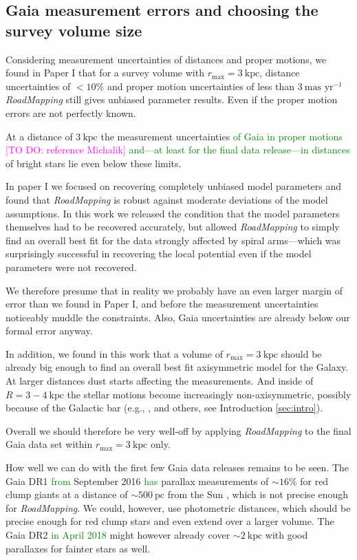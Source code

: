 \documentclass[iop,revtex4,numberedappendix,appendixfloats]{emulateapj}
\newcommand{\RM}{{\sl RoadMapping}}
\newcommand{\Wilma}[1]{\textcolor{Magenta}{#1}}
\newcommand{\NEW}[1]{\textcolor{Green}{#1}}
\newcommand{\OLD}[1]{}
\begin{document}
\subsection{Gaia measurement errors and choosing the survey volume size} \label{sec:discussion_choosing_SV}

Considering measurement uncertainties of distances and proper motions, we found in Paper I that for a survey volume with $r_\text{max} = 3~\text{kpc}$, distance uncertainties of $<10\%$ and proper motion uncertainties of less than $3~\text{mas yr}^{-1}$ \RM{} still gives unbiased parameter results. Even if the proper motion errors are not perfectly known. 

At a distance of $3~\text{kpc}$ the measurement uncertainties \NEW{of Gaia in proper motions \Wilma{[TO DO: reference Michalik]} and---at least for the final data release---in distances} of bright stars \OLD{in (at least the final data release of) Gaia} lie even below these limits. 

In paper I we focused on recovering completely unbiased model parameters and found that \RM{} is robust against moderate deviations of the model assumptions. In this work we released the condition that the model parameters themselves had to be recovered accurately, but allowed \RM{} to simply find an overall best fit for the data strongly affected by spiral arms---which was surprisingly successful in recovering the local potential even if the model parameters were not recovered. 

We therefore presume that in reality we probably have an even larger margin of error than we found in Paper I, and before the measurement uncertainties noticeably muddle the constraints. Also, Gaia uncertainties are already below our formal error anyway.

In addition, we found in this work that a volume of $r_\text{max} = 3~\text{kpc}$ should be already big enough to find an overall best fit axisymmetric model for the Galaxy. At larger distances dust starts affecting the measurements. And inside of $R=3-4~\text{kpc}$ the stellar motions become increasingly non-axisymmetric, possibly because  of the Galactic bar (e.g., \citealt{2014ApJ...783..130R,2015ApJ...800...83B}, and others, see Introduction \ref{sec:intro}).

Overall we should therefore be very well-off by applying \RM{} to the final Gaia data set within $r_\text{max}=3~\text{kpc}$ only.

How well we can do with the first few Gaia data releases remains to be seen. The Gaia DR1 \OLD{in}\NEW{from} September 2016 \OLD{will have}\NEW{has} parallax measurements of $\sim16\%$ for red clump giants at a distance of $\sim 500~\text{pc}$ from the Sun \citep{2014EAS....67...23D,2015A&A...574A.115M}, which is not precise enough for \RM{}. We could, however, use photometric distances, which should be precise enough for red clump stars and even extend over a larger volume. The Gaia DR2 \OLD{at the end of 2017}\NEW{in April 2018} might however already cover $\sim 2~\text{kpc}$ with good parallaxes for fainter stars as well.
\end{document}
